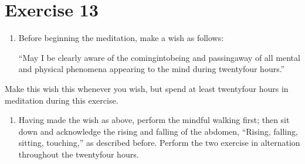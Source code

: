 \documentclass[a5paper,10pt,english]{book}
\begin{document}
\section{Exercise 13}
\label{\detokenize{practice:exercise-13}}\begin{enumerate}
%
\item {} 
\sphinxAtStartPar
Before beginning the meditation, make a wish as follows:

\sphinxAtStartPar
“May I be clearly aware of the coming\sphinxhyphen{}into\sphinxhyphen{}being and passing\sphinxhyphen{}away of all mental and physical phenomena appearing to the mind during twenty\sphinxhyphen{}four hours.”

\end{enumerate}

\sphinxAtStartPar
Make this wish this whenever you wish, but spend at least twenty\sphinxhyphen{}four hours in meditation during this exercise.
\begin{enumerate}
%
\setcounter{enumi}{1}
\item {} 
\sphinxAtStartPar
Having made the wish as above, perform the mindful walking first; then sit down and acknowledge the rising and falling of the abdomen, “Rising, falling, sitting, touching,” as described before. Perform the two exercise in alternation throughout the twenty\sphinxhyphen{}four hours.

\end{enumerate}
\end{document}
